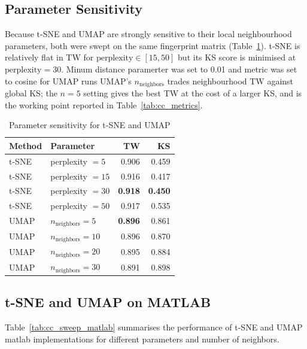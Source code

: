 \subsection{Parameter Sensitivity}

Because t-SNE and UMAP are strongly sensitive to their local
neighbourhood parameters, both were swept on the same fingerprint matrix
(Table~\ref{tab:cc_sweep}).
t-SNE is relatively flat in TW for
$\text{perplexity}\in[15,50]$ but its KS score is minimised at
$\text{perplexity}=30$. Minum distance paramerter was set to 0.01 and 
metric was set to cosine for UMAP runs 
UMAP's $n_{\mathrm{neighbors}}$ trades neighbourhood TW against global
KS; the $n=5$ setting gives the best TW at the cost of a larger KS, and
is the working point reported in Table~\ref{tab:cc_metrics}.

\begin{table}[htbp]
\caption{Parameter sensitivity for t-SNE and UMAP}
\label{tab:cc_sweep}
\centering
\begin{tabular}{llrr}
\toprule
Method & Parameter                          & TW    & KS    \\
\midrule
t-SNE  & perplexity $= 5$                    & 0.906 & 0.459 \\
t-SNE  & perplexity $= 15$                   & 0.916 & 0.417 \\
t-SNE  & perplexity $= 30$                   & \textbf{0.918} & \textbf{0.450} \\
t-SNE  & perplexity $= 50$                   & 0.917 & 0.535 \\
\midrule
UMAP   & $n_{\mathrm{neighbors}} = 5$        & \textbf{0.896} & 0.861 \\
UMAP   & $n_{\mathrm{neighbors}} = 10$       & 0.896 & 0.870 \\
UMAP   & $n_{\mathrm{neighbors}} = 20$       & 0.895 & 0.884 \\
UMAP   & $n_{\mathrm{neighbors}} = 30$       & 0.891 & 0.898 \\
\bottomrule
\end{tabular}
\end{table}

\subsection{t-SNE and UMAP on MATLAB}

Table~\ref{tab:cc_sweep_matlab} summarises the performance of t-SNE and UMAP matlab
 implementations for different parameters and number of neighbors.  
 
